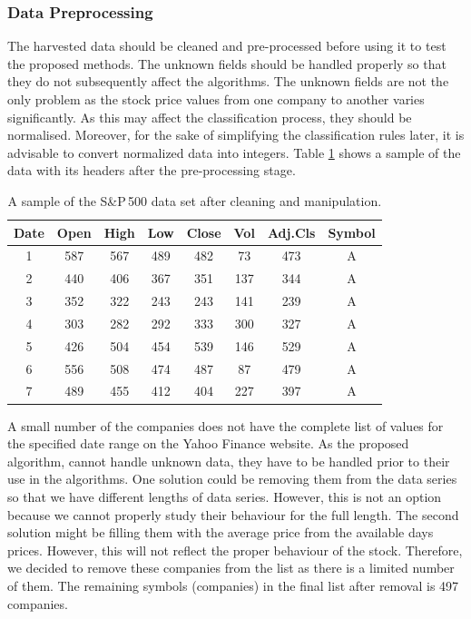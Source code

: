 \subsubsection{Data Preprocessing}

The harvested data should be cleaned and pre-processed before using it to test the proposed methods. The unknown fields should be handled properly so that they do not subsequently affect the algorithms. The unknown fields are not the only problem as the stock price values from one company to another varies significantly. As this may affect the classification process, they should be normalised. Moreover, for the sake of simplifying the classification rules later, it is advisable to convert normalized data into integers. Table \ref{tab:stockdata} shows a sample of the data with its headers after the pre-processing stage.

\begin{table}[!h]
	\centering
	\caption{A sample of the S\&P\,500 data set after cleaning and manipulation.}
	\label{tab:stockdata}
	\begin{tabular}{|c|c|c|c|c|c|c|c|}
		\hline
		\textbf{Date} & \textbf{Open} & \textbf{High} & \textbf{Low} & \textbf{Close} & \textbf{Vol} & \textbf{Adj.Cls} & \textbf{Symbol} \\ \hline
		1    & 587   & 567   & 489   & 482   & 73    & 473    & A    \\ \hline
		2    & 440   & 406   & 367   & 351   & 137    & 344    & A    \\ \hline
		3    & 352   & 322   & 243   & 243   & 141    & 239    & A    \\ \hline
		4    & 303   & 282   & 292   & 333   & 300    & 327    & A    \\ \hline
		5    & 426   & 504   & 454   & 539   & 146    & 529    & A    \\ \hline
		6    & 556   & 508   & 474   & 487   & 87    & 479    & A    \\ \hline
		7    & 489   & 455   & 412   & 404   & 227    & 397    & A    \\ \hline
	\end{tabular}
\end{table}


A small number of the companies does not have the complete list of values for the specified date range on the Yahoo Finance website. As the proposed algorithm, cannot handle unknown data, they have to be handled prior to their use in the algorithms. One solution could be removing them from the data series so that we have different lengths of data series. However, this is not an option because we cannot properly study their behaviour for the full length. The second solution might be filling them with the average price from the available days prices. However, this will not reflect the proper behaviour of the stock. Therefore, we decided to remove these companies from the list as there is a limited number of them. The remaining symbols (companies) in the final list after removal is 497 companies.

